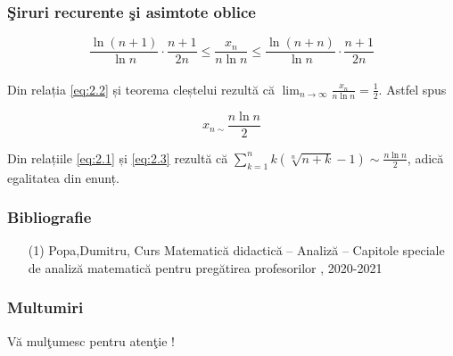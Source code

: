 \documentclass{beamer}
\theoremstyle{plain}
\begin{document}
\frame
{
\frametitle{\c Siruri recurente \c si asimtote oblice}
\begin{displaymath}
 \frac{\ln \left ( n+1 \right )}{\ln n} \cdot \frac{n+1}{2n}\leq \frac{x_{n}}{n\ln n }\leq \frac{\ln \left ( n+n \right )}{\ln n }\cdot \frac{n+1}{2n} \label{eq:2.2} \tag{2.2}
\end{displaymath}
\\ Din relația \ref{eq:2.2} și teorema cleștelui rezultă că \(\lim_{n \to \infty }\frac{x_{n}}{n\ln n } = \frac{1}{2}\). Astfel spus 

\begin{displaymath}
x_{n\sim }\frac{n\ln n }{2} \label{eq:2.3} \tag{2.3}
\end{displaymath}

Din relațiile \ref{eq:2.1} și \ref{eq:2.3} rezultă că \(\sum_{k=1}^{n}k\left ( \sqrt[n]{n+k}-1 \right )\sim \frac{n\ln n }{2}\), adică egalitatea din enunț. 

}
\frame
{
\frametitle{Bibliografie}
\begin{itemize}
\item[(1)] Popa,Dumitru, Curs Matematică didactică – Analiză – Capitole speciale de analiză matematică pentru pregătirea profesorilor , 2020-2021
\end{itemize}
}
\frame
{\frametitle{Multumiri}
\begin{center}
{\Large V\u a mul\c tumesc pentru aten\c tie !}	
\end{center}
}
\end{document}
